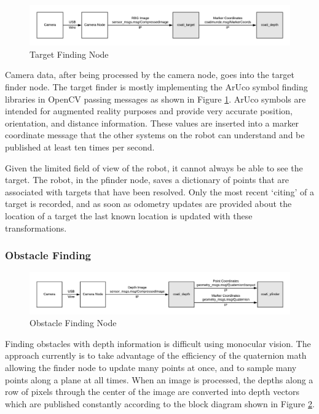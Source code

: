 \documentclass{article}[12]
\begin{document}
	\begin{figure}[H]
		\centering
		\includegraphics[width=0.9\linewidth]{TargetDiagram.png}
		\caption{Target Finding Node}
		\label{fig:target}
	\end{figure}

	Camera data, after being processed by the camera node, goes into the target finder node. The target finder is mostly implementing the ArUco symbol finding libraries in OpenCV passing messages as shown in Figure \ref{fig:target}. ArUco symbols are intended for augmented reality purposes and provide very accurate position, orientation, and distance information. These values are inserted into a marker coordinate message that the other systems on the robot can understand and be published at least ten times per second.
	
	Given the limited field of view of the robot, it cannot always be able to see the target. The robot, in the pfinder node, saves a dictionary of points that are associated with targets that have been resolved. Only the most recent `citing' of a target is recorded, and as soon as odometry updates are provided about the location of a target the last known location is updated with these transformations.
	
	\subsubsection{Obstacle Finding}
	
	\begin{figure}[H]
		\centering
		\includegraphics[width=0.9\linewidth]{DepthDiagram.png}
		\caption{Obstacle Finding Node}
		\label{fig:obstacle}
	\end{figure}

	Finding obstacles with depth information is difficult using monocular vision. The approach currently is to take advantage of the efficiency of the quaternion math allowing the finder node to update many points at once, and to sample many points along a plane at all times. When an image is processed, the depths along a row of pixels through the center of the image are converted into depth vectors which are published constantly according to the block diagram shown in Figure \ref{fig:obstacle}. 
	
\end{document}
